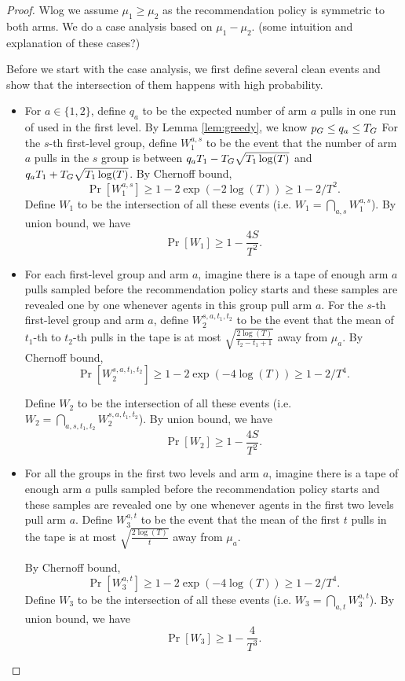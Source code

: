 \begin{proof}
Wlog we assume $\mu_1 \geq \mu_2$ as the recommendation policy is symmetric to both arms. We do a case analysis based on $\mu_1-\mu_2$. (some intuition and explanation of these cases?)

Before we start with the case analysis, we first define several clean events and show that the intersection of them happens with high probability. 
\begin{itemize}
\item For $a \in \{1,2\}$, define $q_a$ to be the expected number of arm $a$ pulls in one run of \ALGG used in the first level. By Lemma \ref{lem:greedy}, we know $p_G \leq q_a \leq T_G$ For the $s$-th first-level group, define $W_1^{a,s}$ to be the event that the number of arm $a$ pulls in the $s$ group is between $q_a T_1- T_G \sqrt{T_1\log(T)}$ and $q_a T_1 + T_G \sqrt{T_1\log(T)}$. By Chernoff bound,
\[
\Pr[W_1^{a,s}] \geq 1-2\exp(-2\log(T)) \geq 1-2/T^2.
\]
Define $W_1$ to be the intersection of all these events (i.e. $W_1 = \bigcap_{a,s}W_1^{a,s}$). By union bound, we have
\[
\Pr[W_1] \geq 1- \frac{4S}{T^2}.
\]
\item For each first-level group and arm $a$, imagine there is a tape of enough arm $a$ pulls sampled before the recommendation policy starts and these samples are revealed one by one whenever agents in this group pull arm $a$. For the $s$-th first-level group and arm $a$, define $W_2^{s,a,t_1,t_2}$ to be the event that the mean of $t_1$-th to $t_2$-th pulls in the tape is at most $\sqrt{\frac{2\log(T)}{t_2-t_1+1}}$ away from $\mu_a$. By Chernoff bound, 
\[
\Pr[W_2^{s,a,t_1,t_2}] \geq 1 - 2\exp(-4\log(T)) \geq 1- 2/T^4.
\]

Define $W_2$ to be the intersection of all these events (i.e. $W_2 = \bigcap_{a,s,t_1,t_2} W_2^{s,a,t_1,t_2}$). By union bound, we have
\[
\Pr[W_2] \geq 1- \frac{4S}{T^2}.
\]

\item For all the groups in the first two levels and arm $a$, imagine there is a tape of enough arm $a$ pulls sampled before the recommendation policy starts and these samples are revealed one by one whenever agents in the first two levels pull arm $a$. Define $W_3^{a,t}$ to be the event that the mean of the first $t$ pulls in the tape is at most $\sqrt{\frac{2\log(T)}{t}}$ away from $\mu_a$.

By Chernoff bound, 
\[
\Pr[W_3^{a,t}] \geq 1 - 2\exp(-4\log(T)) \geq 1- 2/T^4.
\]
Define $W_3$ to be the intersection of all these events (i.e. $W_3 = \bigcap_{a,t} W_3^{a,t}$). By union bound, we have
\[
\Pr[W_3] \geq 1- \frac{4}{T^3}.
\]


\end{itemize}
\end{proof}
